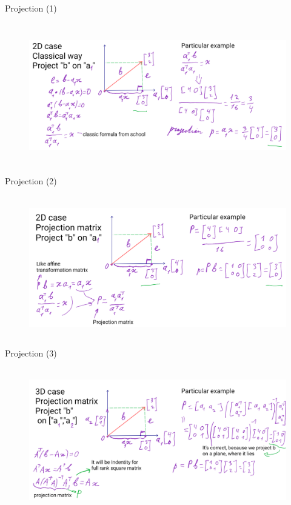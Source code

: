 \documentclass[aspectratio=169]{beamer}
\begin{document}
\begin{frame}[t]{Projection (1)}
\framesubtitle{}
    \begin{figure}[H]
        \centering\includegraphics[height=6cm,width=1\textwidth,keepaspectratio]{AGLA2_for_slides_1.png}
        \label{fig:AGLA2_for_slides_1.png}
    \end{figure}
\end{frame}

\begin{frame}[t]{Projection (2)}
    \framesubtitle{}
        \begin{figure}[H]
            \centering\includegraphics[height=6cm,width=1\textwidth,keepaspectratio]{AGLA2_for_slides_2.png}
            \label{fig:AGLA2_for_slides_2.png}
        \end{figure}
    \end{frame}

    \begin{frame}[t]{Projection (3)}
        \framesubtitle{}
            \begin{figure}[H]
                \centering\includegraphics[height=6cm,width=1\textwidth,keepaspectratio]{AGLA2_for_slides_3.png}
                \label{fig:AGLA2_for_slides_3.png}
            \end{figure}
        \end{frame}
\end{document}
